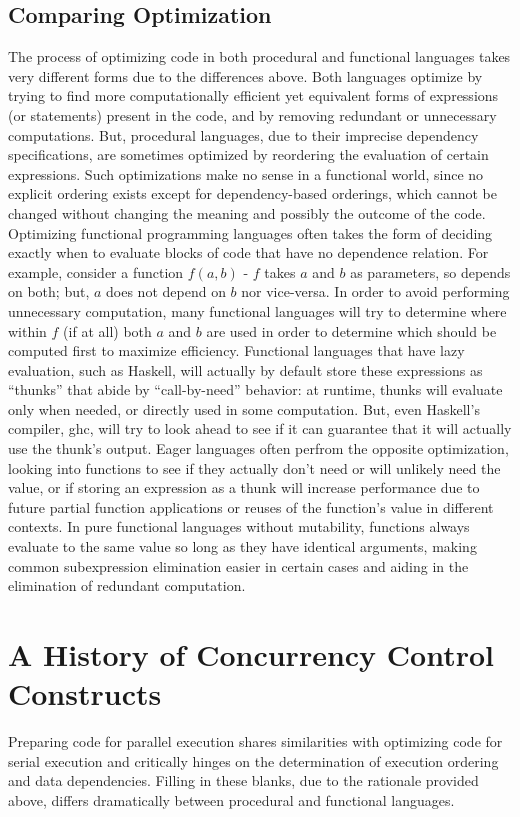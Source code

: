 \subsection{Comparing Optimization}
The process of optimizing code in both procedural and functional languages takes
very different forms due to the differences above. Both languages optimize by
trying to find more computationally efficient yet equivalent forms of
expressions (or statements) present in the code, and by removing redundant or
unnecessary computations. But, procedural languages, due to their imprecise
dependency specifications, are sometimes optimized by reordering the evaluation
of certain expressions. Such optimizations make no sense in a functional world,
since no explicit ordering exists except for dependency-based orderings, which
cannot be changed without changing the meaning and possibly the outcome of the
code. Optimizing functional programming languages often takes the form of
deciding exactly when to evaluate blocks of code that have no dependence
relation. For example, consider a function $f(a,b)$ \-- $f$ takes $a$ and $b$ as
parameters, so depends on both; but, $a$ does not depend on $b$ nor vice-versa.
In order to avoid performing unnecessary computation, many functional languages
will try to determine where within $f$ (if at all) both $a$ and $b$ are used in
order to determine which should be computed first to maximize efficiency.
Functional languages that have lazy evaluation, such as Haskell, will actually
by default store these expressions as ``thunks'' that abide by ``call-by-need''
behavior: at runtime, thunks will evaluate only when needed, or directly used in
some computation. But, even Haskell's compiler, ghc, will try to look ahead to
see if it can guarantee that it will actually use the thunk's output. Eager
languages often perfrom the opposite optimization, looking into functions to see
if they actually don't need or will unlikely need the value, or if storing an
expression as a thunk will increase performance due to future partial function
applications or reuses of the function's value in different contexts. In pure
functional languages without mutability, functions always evaluate to the same
value so long as they have identical arguments, making common subexpression
elimination easier in certain cases and aiding in the elimination of redundant
computation.

\section{A History of Concurrency Control Constructs}
Preparing code for parallel execution shares similarities with optimizing code
for serial execution and critically hinges on the determination of execution
ordering and data dependencies. Filling in these blanks, due to the rationale
provided above, differs dramatically between procedural and functional
languages.

